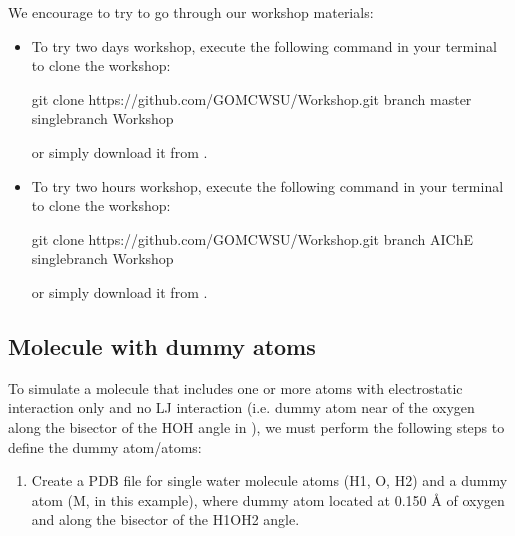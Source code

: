 \documentclass[letterpaper,10pt,english]{sphinxmanual}
\begin{document}
\sphinxAtStartPar
We encourage to try to go through our workshop materials:
\begin{itemize}
\item {} 
\sphinxAtStartPar
To try two days workshop, execute the following command in your terminal to clone the workshop:

\begin{sphinxVerbatim}[commandchars=\\\{\}]
\PYGZdl{} git  clone    https://github.com/GOMC\PYGZhy{}WSU/Workshop.git \PYGZhy{}\PYGZhy{}branch master \PYGZhy{}\PYGZhy{}single\PYGZhy{}branch
\PYGZdl{}    Workshop
\end{sphinxVerbatim}

\sphinxAtStartPar
or simply download it from  .

\item {} 
\sphinxAtStartPar
To try two hours workshop, execute the following command in your terminal to clone the workshop:

\begin{sphinxVerbatim}[commandchars=\\\{\}]
\PYGZdl{} git  clone    https://github.com/GOMC\PYGZhy{}WSU/Workshop.git \PYGZhy{}\PYGZhy{}branch AIChE \PYGZhy{}\PYGZhy{}single\PYGZhy{}branch
\PYGZdl{}    Workshop
\end{sphinxVerbatim}

\sphinxAtStartPar
or simply download it from  .

\end{itemize}


\subsection{Molecule with dummy atoms}
\label{\detokenize{howto:molecule-with-dummy-atoms}}
\sphinxAtStartPar
To simulate a molecule that includes one or more atoms with electrostatic interaction only and no LJ interaction (i.e. dummy atom near of the oxygen along
the bisector of the HOH angle in ), we must perform the following steps
to define the dummy atom/atoms:
\begin{enumerate}
%
\item {} 
\sphinxAtStartPar
Create a PDB file for single water molecule atoms (H1, O, H2) and a dummy atom (M, in this example), where dummy atom located at 0.150 Å of oxygen and along
the bisector of the H1\sphinxhyphen{}O\sphinxhyphen{}H2 angle.

\end{enumerate}
\end{document}
